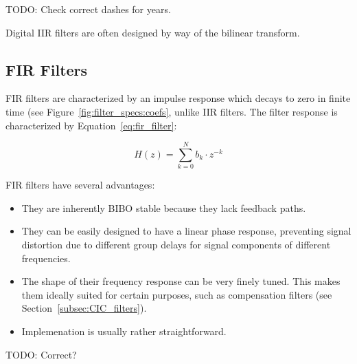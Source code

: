 TODO: Check correct dashes for years.

Digital IIR filters are often designed by way of the bilinear transform.


\subsection{FIR Filters} %
\label{subsec:FIR_filters}

FIR filters are  characterized by an impulse response which  decays to zero in
finite time (see  Figure~\ref{fig:filter_specs:coefs}, unlike IIR filters. The
filter response is characterized by Equation~\ref{eq:fir_filter}:

\begin{equation}
    \label{eq:fir_filter}
    H(z) = \sum_{k=0}^{N} b_k \cdot z^{-k}
\end{equation}

FIR filters have several advantages:

\begin{itemize}\tightlist
    \item
        They are inherently BIBO stable because they lack feedback paths.
    \item
        They  can  be  easily  designed  to  have  a  linear  phase  response,
        preventing signal distortion due to  different group delays for signal
        components of different frequencies.
    \item
        The shape of  their frequency response can be  very finely tuned. This
        makes them ideally  suited for certain purposes,  such as compensation
        filters (see Section~\ref{subsec:CIC_filters}).
    \item
        Implemenation is usually rather straightforward.
\end{itemize}
TODO: Correct?

